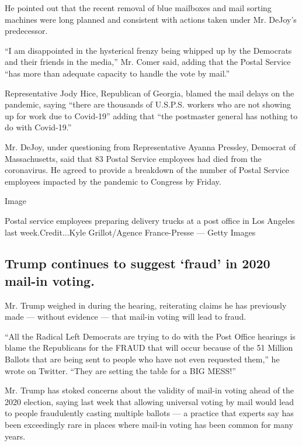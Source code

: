 He pointed out that the recent removal of blue mailboxes and mail
sorting machines were long planned and consistent with actions taken
under Mr. DeJoy's predecessor.

``I am disappointed in the hysterical frenzy being whipped up by the
Democrats and their friends in the media,'' Mr. Comer said, adding that
the Postal Service ``has more than adequate capacity to handle the vote
by mail.''

Representative Jody Hice, Republican of Georgia, blamed the mail delays
on the pandemic, saying ``there are thousands of U.S.P.S. workers who
are not showing up for work due to Covid-19'' adding that ``the
postmaster general has nothing to do with Covid-19.''

Mr. DeJoy, under questioning from Representative Ayanna Pressley,
Democrat of Massachusetts, said that 83 Postal Service employees had
died from the coronavirus. He agreed to provide a breakdown of the
number of Postal Service employees impacted by the pandemic to Congress
by Friday.

Image

Postal service employees preparing delivery trucks at a post office in
Los Angeles last week.Credit...Kyle Grillot/Agence France-Presse ---
Getty Images

\hypertarget{trump-continues-to-suggest-fraud-in-2020-mail-in-voting}{%
\subsection{Trump continues to suggest `fraud' in 2020 mail-in
voting.}\label{trump-continues-to-suggest-fraud-in-2020-mail-in-voting}}

Mr. Trump weighed in during the hearing, reiterating claims he has
previously made --- without evidence --- that mail-in voting will lead
to fraud.

``All the Radical Left Democrats are trying to do with the Post Office
hearings is blame the Republicans for the FRAUD that will occur because
of the 51 Million Ballots that are being sent to people who have not
even requested them,'' he wrote on Twitter. ``They are setting the table
for a BIG MESS!''

Mr. Trump has stoked concerns about the validity of mail-in voting ahead
of the 2020 election, saying last week that allowing universal voting by
mail would lead to people fraudulently casting multiple ballots --- a
practice that experts say has been exceedingly rare in places where
mail-in voting has been common for many years.


